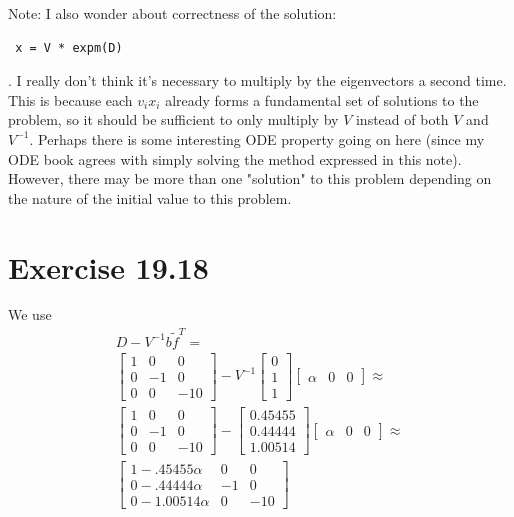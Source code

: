 \documentclass[11pt]{article}
\begin{document}
Note: I also wonder about correctness of the solution: 
\begin{verbatim} x = V * expm(D)\end{verbatim}
. I really don't think it's necessary to multiply
by the eigenvectors a second time. This is because each $v_i x_i$ already forms
a fundamental set of solutions to the problem, so it should be sufficient
to only multiply by $V$ instead of both $V$ and $V^{-1}$. Perhaps there is 
some interesting ODE property going on here (since my ODE book agrees with
simply solving the method expressed in this note). However, there may be
more than one "solution" to this problem depending on the nature of the
initial value to this problem.

\section*{Exercise 19.18}
We use
\begin{align*}
    D - V^{-1}b\tilde{f}^T = \\
    \left[\begin{array}{ccc}
        1 & 0 & 0\\
        0 & -1 & 0\\
        0 & 0 & -10
    \end{array}\right]
    - V^{-1}
    \left[\begin{array}{c}
     0\\
     1\\
     1
     \end{array}\right]
     \left[\begin{array}{ccc}
     \alpha & 0 & 0
     \end{array}\right] \approx \\
     \left[\begin{array}{ccc}
        1 & 0 & 0\\
        0 & -1 & 0\\
        0 & 0 & -10
     \end{array}\right] -
     \left[\begin{array}{c}
        0.45455\\
        0.44444\\
        1.00514
     \end{array}\right]
     \left[\begin{array}{ccc}
      \alpha & 0 & 0
     \end{array}\right] \approx\\
     \left[\begin{array}{ccc}
        1 - .45455 \alpha& 0 & 0\\
        0 - .44444 \alpha& -1 & 0\\
        0 - 1.00514 \alpha& 0 & -10
     \end{array}\right]
\end{align*}
\end{document}
